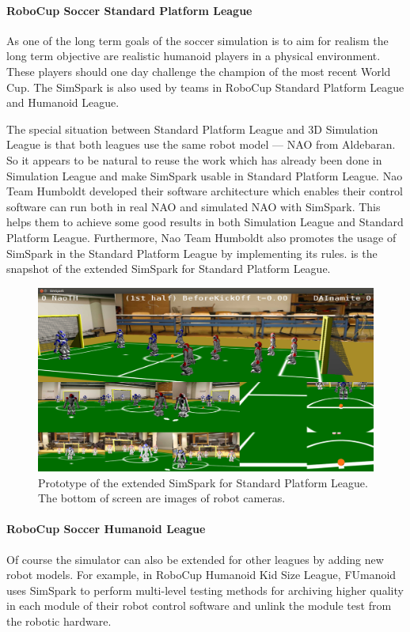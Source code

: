 \documentclass{llncs}
\begin{document}
\paragraph{RoboCup Soccer Standard Platform League}
As one of the long term goals of the soccer simulation is to aim for realism the long term objective are realistic humanoid players in a physical environment.
These players should one day challenge the champion of the most recent World Cup.
The SimSpark is also used by teams in RoboCup Standard Platform League and Humanoid League.

The special situation between Standard Platform League and 3D Simulation League is that both leagues use the same robot model — NAO from Aldebaran.
So it appears to be natural to reuse the work which has already been done in Simulation League and make SimSpark usable in Standard Platform League.
Nao Team Humboldt developed their software architecture\cite{SCPR2010} which enables their control software can run both in real NAO and simulated NAO with SimSpark. This helps them to achieve some good results in both Simulation League and Standard Platform League.
Furthermore, Nao Team Humboldt also promotes the usage of SimSpark in the Standard Platform League by implementing its rules.  is the snapshot of the extended SimSpark for Standard Platform League.

\begin{figure}
  \centering
  \includegraphics[width = 0.75\columnwidth]{simspark-spl}
  \caption{Prototype of the extended SimSpark for Standard Platform League.
    The bottom of screen are images of robot cameras.}
  \label{f:simspark-spl}
\end{figure}

\paragraph{RoboCup Soccer Humanoid League}
Of course the simulator can also be extended for other leagues by adding new robot models.
For example, in RoboCup Humanoid Kid Size League, FUmanoid\cite{Donat2012} uses
SimSpark to perform multi-level testing methods for archiving higher
quality in each module of their robot control software and unlink the
module test from the robotic hardware.
\end{document}
